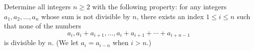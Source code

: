 Determine all integers $n \geq 2$ with the following property: for any integers $a_1, a_2, \ldots, a_n$ whose sum is not divisible by $n$, there exists an index $1 \leq i \leq n$ such that none of the numbers
\[
a_i, a_i + a_{i+1}, \ldots, a_i + a_{i+1} + \cdots + a_{i+n-1}
\]
is divisible by $n$. (We let $a_i = a_{i-n}$ when $i > n$.)
